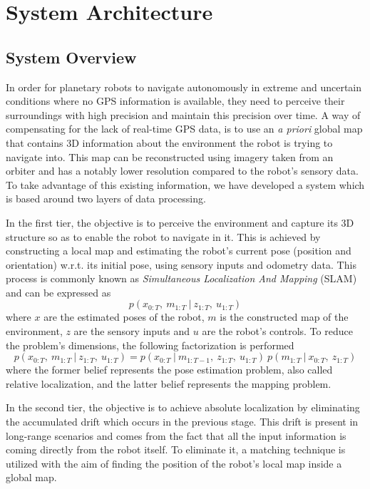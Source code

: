 \label{Chapter2}

\chapter{System Architecture}

\section{System Overview} \label{system_overview}

In order for planetary robots to navigate autonomously in extreme and
uncertain conditions where no GPS information is available,
they need to perceive their surroundings with high precision and
maintain this precision over time.
A way of compensating for the lack of real-time GPS data, is to use
an \textit{a priori} global map that contains 3D information about the
environment the robot is trying to navigate into.
This map can be reconstructed using imagery taken from an orbiter and
has a notably lower resolution compared to the robot's sensory data.
To take advantage of this existing information, we have developed a system
which is based around two layers of data processing.

In the first tier, the objective is to perceive the environment and
capture its 3D structure so as to enable the robot to navigate in it.
This is achieved by constructing a local map and estimating the robot's
current pose (position and orientation) w.r.t. its initial pose,
using sensory inputs and odometry data.
This process is commonly known as
\textit{Simultaneous Localization And Mapping} (SLAM) and can be expressed as
\begin{equation}
    p(x_{0:T} ,\ m_{1:T} \ | \ z_{1:T} ,\ u_{1:T})
\end{equation}
where
$x$ are the estimated poses of the robot,
$m$ is the constructed map of the environment,
$z$ are the sensory inputs and
$u$ are the robot's controls.
To reduce the problem's dimensions, the following factorization is performed
\begin{equation}
    p(x_{0:T} ,\ m_{1:T} \ | \ z_{1:T} ,\ u_{1:T}) =
    p(x_{0:T} \ | \ m_{1:T-1} ,\ z_{1:T} ,\ u_{1:T}) \
    p(m_{1:T} \ | \ x_{0:T} ,\ z_{1:T})
\end{equation}
where
the former belief represents the pose estimation problem, also called
relative localization, and the latter belief represents the mapping problem.

In the second tier, the objective is to achieve absolute localization by
eliminating the accumulated drift which occurs in the previous stage.
This drift is present in long-range scenarios and comes from the fact that
all the input information is coming directly from the robot itself.
To eliminate it, a matching technique is utilized with the aim of finding the
position of the robot's local map inside a global map.

